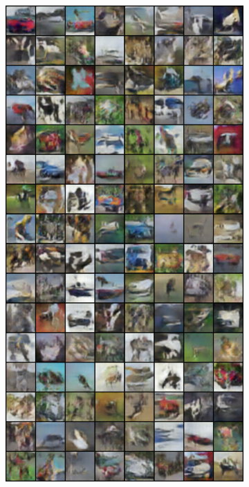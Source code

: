 \begin{figure}[H]
\begin{subfigure}{0.2\textwidth}
        \centering
        \includegraphics[width=0.95\linewidth]{cifar10/64_nz100/fake_sample_epoch_0020.png}
        \caption{}
        \label{subfig:cifar10/64_nz100/fake_sample_epoch_0020}
    \end{subfigure}%

\end{figure}
